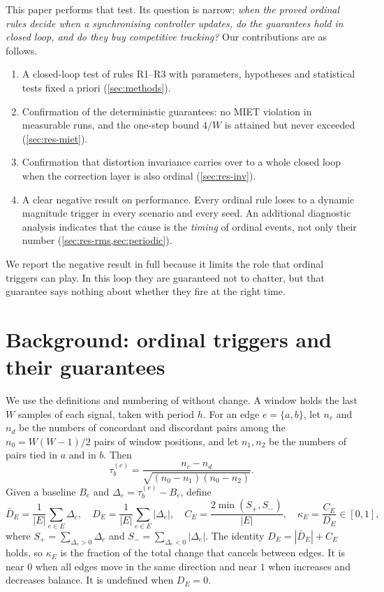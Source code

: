 \documentclass[10pt,a4paper]{article}
\newcommand{\te}{\tau_b^{(e)}}
\newcommand{\R}[1]{\textup{R#1}}
\begin{document}
This paper performs that test. Its question is narrow: \emph{when the proved ordinal rules decide when a synchronising controller updates, do the guarantees hold in closed loop, and do they buy competitive tracking?} Our contributions are as follows.
\begin{enumerate}[leftmargin=*,itemsep=1pt]
\item A closed-loop test of rules \R{1}--\R{3} with parameters, hypotheses and statistical tests fixed a priori (\cref{sec:methods}).
\item Confirmation of the deterministic guarantees: no MIET violation in \nMeasurable{} measurable runs, and the one-step bound $4/W$ is attained but never exceeded (\cref{sec:res-miet}).
\item Confirmation that distortion invariance carries over to a whole closed loop when the correction layer is also ordinal (\cref{sec:res-inv}).
\item A clear negative result on performance. Every ordinal rule loses to a dynamic magnitude trigger in every scenario and every seed. An additional diagnostic analysis indicates that the cause is the \emph{timing} of ordinal events, not only their number (\cref{sec:res-rms,sec:periodic}).
\end{enumerate}
We report the negative result in full because it limits the role that ordinal triggers can play. In this loop they are guaranteed not to chatter, but that guarantee says nothing about whether they fire at the right time.

\section{Background: ordinal triggers and their guarantees}\label{sec:background}

We use the definitions and numbering of \citep{pv2026miet} without change. A window holds the last $W$ samples of each signal, taken with period $h$. For an edge $e=\{a,b\}$, let $n_c$ and $n_d$ be the numbers of concordant and discordant pairs among the $n_0=W(W-1)/2$ pairs of window positions, and let $n_1,n_2$ be the numbers of pairs tied in $a$ and in $b$. Then
\begin{equation}
\te=\frac{n_c-n_d}{\sqrt{(n_0-n_1)(n_0-n_2)}} .
\end{equation}
Given a baseline $B_e$ and $\Delta_e=\te-B_e$, define
\begin{equation}\label{eq:DE}
\bar D_E=\frac1{|E|}\sum_{e\in E}\Delta_e,\quad D_E=\frac1{|E|}\sum_{e\in E}|\Delta_e|,\quad C_E=\frac{2\min(S_+,S_-)}{|E|},\quad \kappa_E=\frac{C_E}{D_E}\in[0,1],
\end{equation}
where $S_+=\sum_{\Delta_e>0}\Delta_e$ and $S_-=\sum_{\Delta_e<0}|\Delta_e|$. The identity $D_E=|\bar D_E|+C_E$ holds, so $\kappa_E$ is the fraction of the total change that cancels between edges. It is near $0$ when all edges move in the same direction and near $1$ when increases and decreases balance. It is undefined when $D_E=0$.
\end{document}
